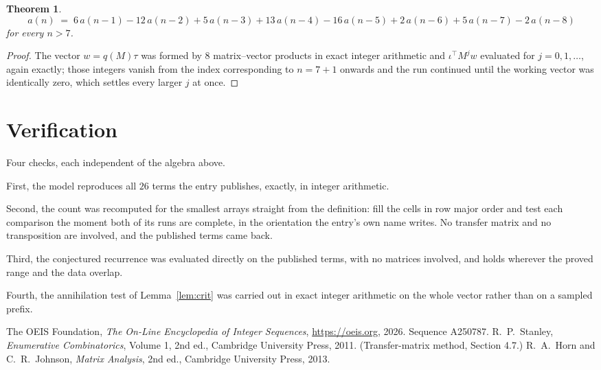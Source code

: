 \documentclass[11pt,a4paper]{article}
\theoremstyle{plain}
\newtheorem{theorem}{Theorem}
\theoremstyle{definition}
\begin{document}
\begin{theorem}
\[
a(n)\;=\;6\,a(n-1) - 12\,a(n-2) + 5\,a(n-3) + 13\,a(n-4) - 16\,a(n-5) + 2\,a(n-6) + 5\,a(n-7) - 2\,a(n-8)
\]
for every $n>7$.
\end{theorem}

\begin{proof}
The vector $w=q(M)\tau$ was formed by $8$ matrix--vector products in exact integer
arithmetic and $\iota^{\!\top}M^{j}w$ evaluated for $j=0,1,\dots$, again exactly; those
integers vanish from the index corresponding to $n=7+1$ onwards and the run continued
until the working vector was identically zero, which settles every larger $j$ at once.
\end{proof}

\section{Verification}

Four checks, each independent of the algebra above.

First, the model reproduces all $26$ terms the entry publishes, exactly, in integer
arithmetic.

Second, the count was recomputed for the smallest arrays straight from the definition: fill the
cells in row major order and test each comparison the moment both of its runs are complete,
in the orientation the entry's own name writes. No transfer matrix and no transposition are
involved, and the published terms came back.

Third, the conjectured recurrence was evaluated directly on the published terms, with no
matrices involved, and holds wherever the proved range and the data overlap.

Fourth, the annihilation test of Lemma~\ref{lem:crit} was carried out in exact integer
arithmetic on the whole vector rather than on a sampled prefix.

\begin{thebibliography}{9}
 The OEIS Foundation, \emph{The On-Line Encyclopedia of Integer
Sequences}, \url{https://oeis.org}, 2026. Sequence A250787.
 R.~P.~Stanley, \emph{Enumerative Combinatorics}, Volume 1, 2nd ed.,
Cambridge University Press, 2011. (Transfer-matrix method, Section 4.7.)
 R.~A.~Horn and C.~R.~Johnson, \emph{Matrix Analysis}, 2nd ed., Cambridge
University Press, 2013.
\end{thebibliography}
\end{document}
